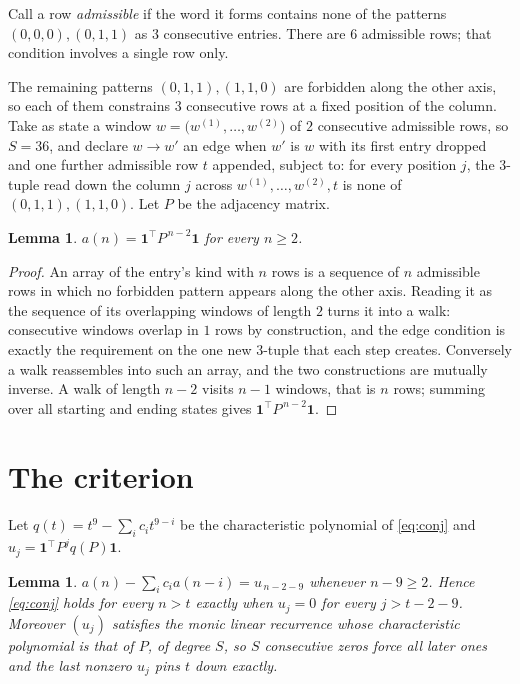 \documentclass[11pt,a4paper]{article}
\theoremstyle{plain}
\newtheorem{lemma}[theorem]{Lemma}
\theoremstyle{definition}
\begin{document}
Call a row \emph{admissible} if the word it forms contains none of the patterns
$(0,0,0), (0,1,1)$ as $3$ consecutive entries. There are $6$ admissible rows; that condition
involves a single row only.

The remaining patterns $(0,1,1), (1,1,0)$ are forbidden along the other axis, so each of them
constrains $3$ consecutive rows at a fixed position of the column. Take as state a
window $w=\bigl(w^{(1)},\dots,w^{(2)}\bigr)$ of $2$ consecutive admissible
rows, so $S=36$, and declare $w\to w'$ an edge when $w'$ is $w$ with its first entry
dropped and one further admissible row $t$ appended, subject to: for every position
$j$, the $3$-tuple read down the column $j$ across $w^{(1)},\dots,w^{(2)},t$
is none of $(0,1,1), (1,1,0)$. Let $P$ be the adjacency matrix.

\begin{lemma}\label{lem:walk}
$a(n)=\mathbf{1}^{\!\top}P^{\,n-2}\mathbf{1}$ for every $n\ge2$.
\end{lemma}

\begin{proof}
An array of the entry's kind with $n$ rows is a sequence of $n$ admissible rows in
which no forbidden pattern appears along the other axis. Reading it as the sequence of its
overlapping windows of length $2$ turns it into a walk: consecutive windows overlap in
$1$ rows by construction, and the edge condition is exactly the requirement on the one
new $3$-tuple that each step creates. Conversely a walk reassembles into such an array,
and the two constructions are mutually inverse. A walk of length $n-2$ visits $n-1$
windows, that is $n$ rows; summing over all starting and ending states gives
$\mathbf{1}^{\!\top}P^{\,n-2}\mathbf{1}$.
\end{proof}

\section{The criterion}

Let $q(t)=t^{9}-\sum_i c_i t^{9-i}$ be the characteristic polynomial of
\eqref{eq:conj} and $u_j=\mathbf{1}^{\!\top}P^{j}q(P)\mathbf{1}$.

\begin{lemma}\label{lem:crit}
$a(n)-\sum_i c_i a(n-i)=u_{\,n-2-9}$ whenever $n-9\ge2$. Hence
\eqref{eq:conj} holds for every $n>t$ exactly when $u_j=0$ for every
$j>t-2-9$. Moreover $(u_j)$ satisfies the monic linear recurrence whose
characteristic polynomial is that of $P$, of degree $S$, so $S$ consecutive zeros force all
later ones and the last nonzero $u_j$ pins $t$ down exactly.
\end{lemma}
\end{document}
